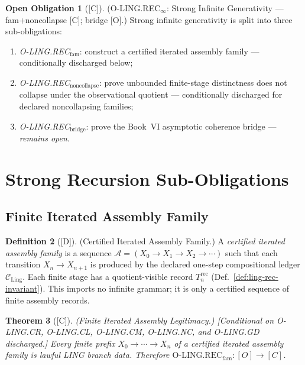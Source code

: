 \documentclass[12pt,oneside]{amsbook}
\theoremstyle{plain}
\newtheorem{theorem}{Theorem}[section]
\theoremstyle{definition}
\newtheorem{definition}[theorem]{Definition}
\newtheorem{obligation}[theorem]{Open Obligation}
\theoremstyle{remark}
\newcommand{\status}[1]{\textup{[#1]}}
\begin{document}
\begin{obligation}[\status{C}]\label{ob:ling-rec-infty}
\textup{(O-LING.REC$_\infty$: Strong Infinite Generativity --- fam+noncollapse [C]; bridge [O].)}
Strong infinite generativity is split into three sub-obligations:
\begin{enumerate}[label=\textup{(\arabic*)}]
 \item \emph{O-LING.REC$_{\mathrm{fam}}$}: construct a certified
 iterated assembly family --- conditionally discharged below;
 \item \emph{O-LING.REC$_{\mathrm{noncollapse}}$}: prove unbounded
 finite-stage distinctness does not collapse under the observational
 quotient --- conditionally discharged for declared noncollapsing families;
 \item \emph{O-LING.REC$_{\mathrm{bridge}}$}: prove the Book~VI
 asymptotic coherence bridge --- \emph{remains open}.
\end{enumerate}
\end{obligation}

\section{Strong Recursion Sub-Obligations}\label{sec:ling-REC-infty}

\subsection{Finite Iterated Assembly Family}

\begin{definition}[\status{D}]\label{def:ling-certified-iterated-assembly-family}
\textup{(Certified Iterated Assembly Family.)}
A \emph{certified iterated assembly family} is a sequence
$\mathcal{A} = (X_0 \to X_1 \to X_2 \to \cdots)$
such that each transition $X_n \to X_{n+1}$ is produced by the
declared one-step compositional ledger $\mathcal{C}_{\mathrm{Ling}}$.
Each finite stage has a quotient-visible record $T_n^{\mathrm{rec}}$
(Def.~\ref{def:ling-rec-invariant}). This imports no infinite grammar;
it is only a certified sequence of finite assembly records.
\end{definition}

\begin{theorem}[\status{C}]\label{thm:ling-rec-finite-iterated-assembly}
\textup{(Finite Iterated Assembly Legitimacy.)}
\textup{[Conditional on O-LING.CR, O-LING.CL, O-LING.CM, O-LING.NC,
and O-LING.GD discharged.]}
Every finite prefix $X_0 \to \cdots \to X_n$ of a certified iterated
assembly family is lawful LING branch data.
Therefore $\mathrm{O\text{-}LING.REC}_{\mathrm{fam}} : [O] \to [C]$.
\end{theorem}
\end{document}
